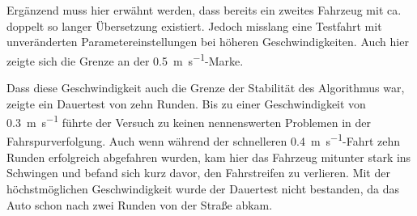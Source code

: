 Ergänzend muss hier erwähnt werden, dass bereits ein zweites Fahrzeug mit ca. doppelt so langer Übersetzung existiert. Jedoch misslang eine Testfahrt mit unveränderten Parametereinstellungen bei höheren Geschwindigkeiten. Auch hier zeigte sich die Grenze an der \SI{0,5}{\metre\per\second}-Marke.

Dass diese Geschwindigkeit auch die Grenze der Stabilität des Algorithmus war, zeigte ein \glqq Dauertest\grqq{} von zehn Runden. Bis zu einer Geschwindigkeit von \SI{0,3}{\metre\per\second} führte der Versuch zu keinen nennenswerten Problemen in der Fahrspurverfolgung. Auch wenn während der schnelleren \SI{0,4}{\metre\per\second}-Fahrt zehn Runden erfolgreich abgefahren wurden, kam hier das Fahrzeug mitunter stark ins Schwingen und befand sich kurz davor, den Fahrstreifen zu verlieren. Mit der höchstmöglichen Geschwindigkeit wurde der Dauertest nicht bestanden, da das Auto schon nach zwei Runden von der Straße abkam.